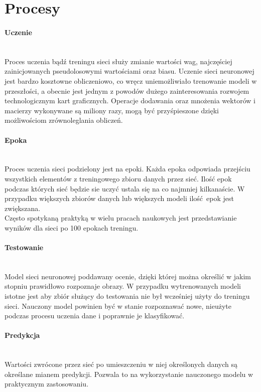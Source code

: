 \section{Procesy}

\paragraph{Uczenie} \mbox{}\\
Proces uczenia bądź treningu sieci służy zmianie wartości wag, najczęściej zainicjowanych
pseudolosowymi wartościami oraz biasu. Uczenie sieci neuronowej jest bardzo
kosztowne obliczeniowo, co wręcz uniemożliwiało trenowanie modeli w przeszłości,
a obecnie jest jednym z powodów dużego zainteresowania rozwojem technologicznym kart
graficznych. Operacje dodawania oraz mnożenia wektorów i macierzy wykonywane są miliony razy,
mogą być przyśpieszone dzięki możliwościom zrównoleglania obliczeń.\\

\paragraph{Epoka} \mbox{}\\
Proces uczenia sieci podzielony jest na epoki. Każda epoka odpowiada przejściu
wszystkich elementów z treningowego zbioru danych przez sieć. Ilość epok podczas
których sieć będzie sie uczyć ustala się na co najmniej kilkanaście. W przypadku
większych zbiorów danych lub większych modeli ilość epok jest zwiększana.\\
Często spotykaną praktyką w wielu pracach naukowych jest przedstawianie wyników
dla sieci po 100 epokach treningu.

\paragraph{Testowanie} \mbox{}\\
Model sieci neuronowej poddawany ocenie, dzięki której można określić w jakim stopniu
prawidłowo rozpoznaje obrazy. W przypadku wytrenowanych modeli istotne jest aby zbiór służący do
testowania nie był wcześniej użyty do treningu sieci. Nauczony model powinien być w stanie
rozpoznawać nowe, nieużyte podczas procesu uczenia dane i poprawnie je klasyfikować.

\paragraph{Predykcja} \mbox{}\\
Wartości zwrócone przez sieć po umieszczeniu w niej określonych danych są określane
mianem predykcji. Pozwala to na wykorzystanie nauczonego modelu w praktycznym
zastosowaniu.


